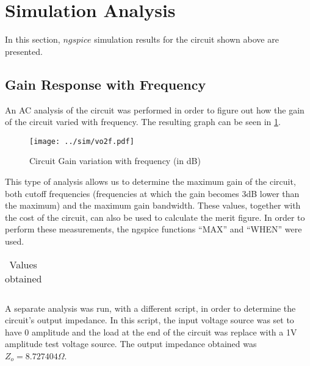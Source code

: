 \section{Simulation Analysis}
\label{sec:simulation}

In this section, $ngspice$ simulation results for the circuit shown above are presented.


\subsection{Gain Response with Frequency}

An AC analysis of the circuit was performed in order to figure out how the gain of the circuit varied with frequency. The resulting graph can be seen in \ref{fig:gain_freq}.

\begin{figure}[H] \centering
\texttt{[image: ../sim/vo2f.pdf]}
\caption{Circuit Gain variation with frequency (in dB)}
\label{fig:gain_freq}
\end{figure}

This type of analysis allows us to determine the maximum gain of the circuit, both cutoff frequencies (frequencies at which the gain becomes 3dB lower than the maximum) and the maximum gain bandwidth. These values, together with the cost of the circuit, can also be used to calculate the merit figure. In order to perform these measurements, the ngspice functions ``MAX'' and ``WHEN'' were used.

\begin{table}[H]
  \centering
  \begin{tabular}{|c|c|}
    \hline
      
  \end{tabular}
  \caption{Values obtained}
  \label{tab:resultssim}
\end{table}

A separate analysis was run, with a different script, in order to determine the circuit's output impedance. In this script, the input voltage source was set to have 0 amplitude and the load at the end of the circuit was replace with a 1V amplitude test voltage source. The output impedance obtained was $Z_o = 8.727404 \Omega$.





